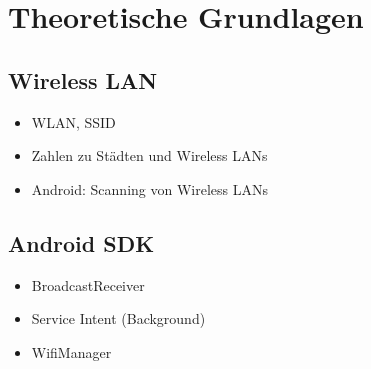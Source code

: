 \chapter{Theoretische Grundlagen}
\label{sec:TheoretischeGrundlagen}

\section{Wireless LAN}
\begin{itemize}
\item WLAN, SSID
\item Zahlen zu Städten und Wireless LANs
\item Android: Scanning von Wireless LANs
\end{itemize}


\section{Android SDK}
\begin{itemize}
\item BroadcastReceiver
\item Service Intent (Background)
\item WifiManager
\end{itemize}
